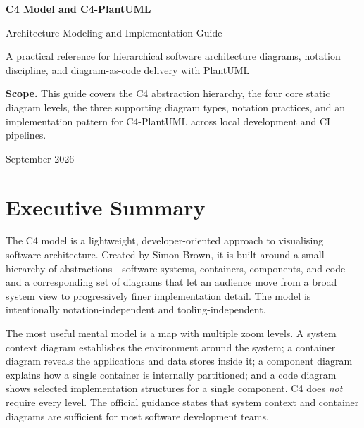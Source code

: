\documentclass[11pt]{article}
\begin{document}
\begin{titlepage}
\centering
\vspace*{1.2in}
{\Huge\bfseries\color{Navy} C4 Model and C4-PlantUML\par}
\vspace{0.25in}
{\LARGE\color{Blue} Architecture Modeling and Implementation Guide\par}
\vspace{0.45in}
{\large A practical reference for hierarchical software architecture diagrams, notation discipline, and diagram-as-code delivery with PlantUML\par}
\vfill
\begin{tcolorbox}[colback=Ice,colframe=Rule,boxrule=0.6pt,width=0.88\textwidth,arc=2mm]
\small
\textbf{Scope.} This guide covers the C4 abstraction hierarchy, the four core static diagram levels, the three supporting diagram types, notation practices, and an implementation pattern for C4-PlantUML across local development and CI pipelines.
\end{tcolorbox}
\vfill
{\large September 2026\par}
\end{titlepage}

\tableofcontents
\newpage

\section{Executive Summary}

The C4 model is a lightweight, developer-oriented approach to visualising software architecture. Created by Simon Brown, it is built around a small hierarchy of abstractions---software systems, containers, components, and code---and a corresponding set of diagrams that let an audience move from a broad system view to progressively finer implementation detail. The model is intentionally notation-independent and tooling-independent.\cite{c4home,c4intro}

The most useful mental model is a map with multiple zoom levels. A system context diagram establishes the environment around the system; a container diagram reveals the applications and data stores inside it; a component diagram explains how a single container is internally partitioned; and a code diagram shows selected implementation structures for a single component. C4 does \emph{not} require every level. The official guidance states that system context and container diagrams are sufficient for most software development teams.\cite{c4diagrams}
\end{document}
